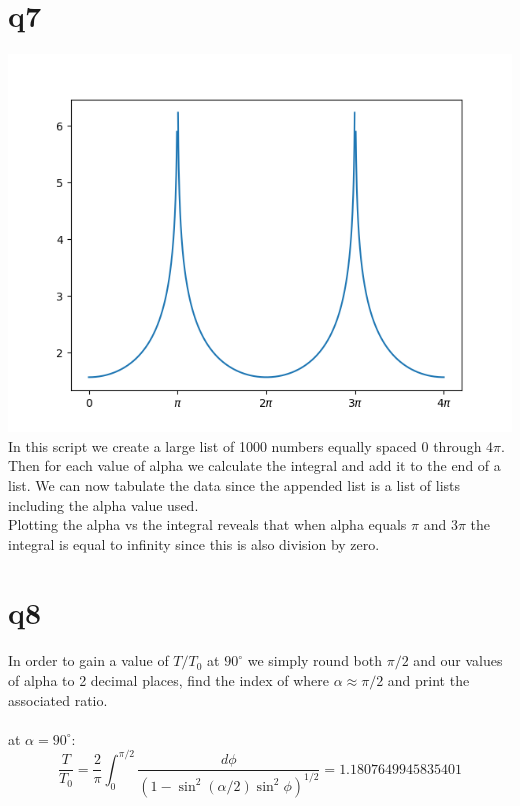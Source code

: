 \documentclass[a4paper,english]{article}
\begin{document}
    \section{q7}
    
    \includegraphics[scale=0.8]{q4_7.png}
        In this script we create a large list of 1000 numbers equally spaced 0 through $4\pi$.
        Then for each value of alpha we calculate the integral and add it to the end of a list.
        We can now tabulate the data since the appended list is a list of lists including the 
        alpha value used.
        \\
        Plotting the alpha vs the integral reveals that when alpha equals $\pi$ and $3\pi$ the integral
        is equal to infinity since this is also division by zero.
        \\
    \section{q8}
    
        In order to gain a value of $T/T_0$ at $90^\circ$ we simply round both $\pi/2$ and 
        our values of alpha to 2 decimal places, find the index of where $\alpha \approx \pi/2$
        and print the associated ratio.
        \\
        \\
        at $\alpha = 90^\circ$:
    \begin{equation}
        \frac{T}{T_0} = \frac{2}{\pi}\int_0^{\pi/2}\frac{d\phi}{(1-\sin^2(\alpha/2)\sin^2\phi)^{1/2}} 
        = 1.1807649945835401
    \end{equation}
        \\
\end{document}
